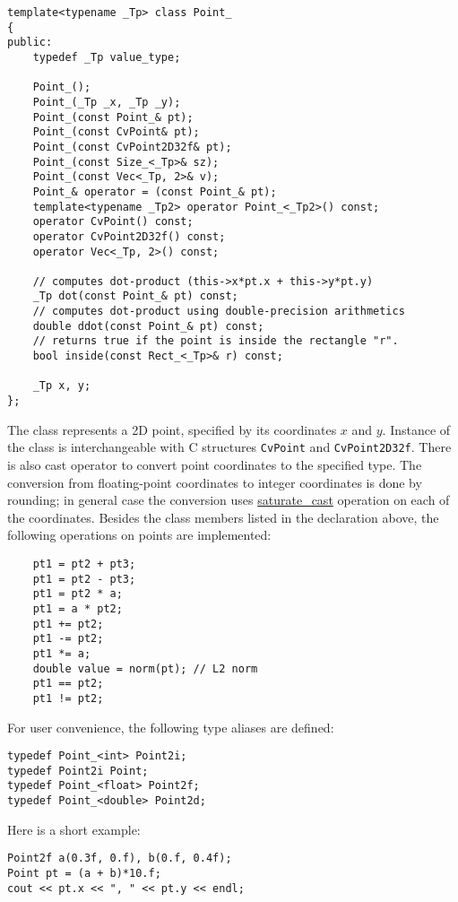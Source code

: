 \begin{lstlisting}
template<typename _Tp> class Point_
{
public:
    typedef _Tp value_type;
    
    Point_();
    Point_(_Tp _x, _Tp _y);
    Point_(const Point_& pt);
    Point_(const CvPoint& pt);
    Point_(const CvPoint2D32f& pt);
    Point_(const Size_<_Tp>& sz);
    Point_(const Vec<_Tp, 2>& v);
    Point_& operator = (const Point_& pt);
    template<typename _Tp2> operator Point_<_Tp2>() const;
    operator CvPoint() const;
    operator CvPoint2D32f() const;
    operator Vec<_Tp, 2>() const;

    // computes dot-product (this->x*pt.x + this->y*pt.y)
    _Tp dot(const Point_& pt) const;
    // computes dot-product using double-precision arithmetics
    double ddot(const Point_& pt) const;
    // returns true if the point is inside the rectangle "r".
    bool inside(const Rect_<_Tp>& r) const;
    
    _Tp x, y;
};
\end{lstlisting}

The class represents a 2D point, specified by its coordinates $x$ and $y$.
Instance of the class is interchangeable with C structures \texttt{CvPoint} and \texttt{CvPoint2D32f}. There is also cast operator to convert point coordinates to the specified type. The conversion from floating-point coordinates to integer coordinates is done by rounding; in general case the conversion uses \hyperref[saturatecast]{saturate\_cast} operation on each of the coordinates. Besides the class members listed in the declaration above, the following operations on points are implemented:

\begin{lstlisting}
    pt1 = pt2 + pt3;
    pt1 = pt2 - pt3;
    pt1 = pt2 * a;
    pt1 = a * pt2;
    pt1 += pt2;
    pt1 -= pt2;
    pt1 *= a;
    double value = norm(pt); // L2 norm
    pt1 == pt2;
    pt1 != pt2;
\end{lstlisting}

For user convenience, the following type aliases are defined:
\begin{lstlisting}
typedef Point_<int> Point2i;
typedef Point2i Point;
typedef Point_<float> Point2f;
typedef Point_<double> Point2d;
\end{lstlisting}

Here is a short example:
\begin{lstlisting}
Point2f a(0.3f, 0.f), b(0.f, 0.4f);
Point pt = (a + b)*10.f;
cout << pt.x << ", " << pt.y << endl; 
\end{lstlisting}

